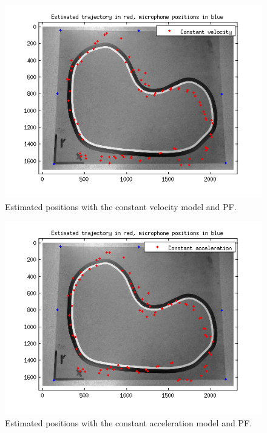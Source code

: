 \documentclass[10pt,a4paper]{report}
\begin{document}
\begin{figure}[H]
\begin{center}
  \includegraphics[width = 350pt]{pf_CV.png}
  \caption{Estimated positions with the constant velocity model and PF.}
  \label{pf_CV}
  \end{center}
\end{figure}
\begin{figure}[H]
\begin{center}
  \includegraphics[width = 350pt]{pf_CA.png}
  \caption{Estimated positions with the constant acceleration model and PF.}
  \label{pf_CA}
  \end{center}
\end{figure}
\newpage
\end{document}
